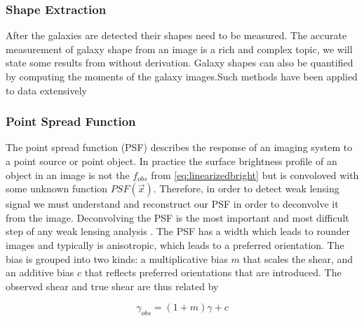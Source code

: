 \subsubsection{Shape Extraction}
After the galaxies are detected their shapes need to be measured. The accurate measurement of galaxy shape from an image is a rich and complex topic, we will state some results from \cite{massey_2013,general_2013} without derivation. 
Galaxy shapes can also be quantified by computing the moments of the galaxy images.Such methods have been applied to data extensively

\subsubsection{Point Spread Function}

The point spread function (PSF) describes the response of an imaging system to a point source or point object. In practice the surface brightness profile of an object in an image is not the $f_{obs}$ from \autoref{eq:linearizedbright} but is convoloved with some unknown function $PSF(\vec{x})$. Therefore, in order to detect weak lensing signal we must understand and reconstruct our PSF in order to deconvolve it from the image. Deconvolving the PSF is the most important and most difficult step of any weak lensing analysis \cite{Hoekstra:2013gua,rachel_2018}. The PSF has a width which leads to rounder images and typically is anisotropic, which leads to a preferred orientation. The bias is grouped into two kinds: a multiplicative bias $m$ that scales the shear, and an additive bias $c$ that reflects preferred orientations that are introduced. The observed shear and true shear are thus related by

\begin{equation}
    \gamma_{obs} = (1+m) \gamma + c
     \label{eq:shearobs}
\end{equation}




